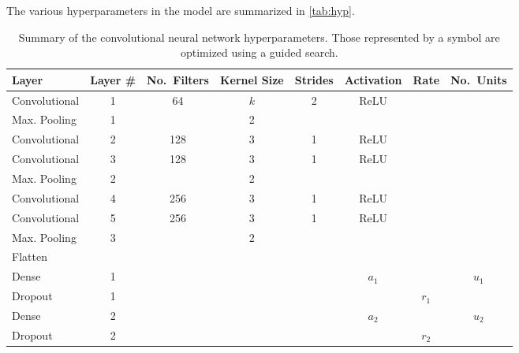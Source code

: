 \documentclass[NewProceedindgs, NoLineNumbers, SectionNumbers, letterpaper, SingleSpace, InsideFigs]{ascelike-new}
\begin{document}
The various hyperparameters in the model are summarized in \autoref{tab:hyp}.
\begin{table}[]\small
{}
    \centering
    \begin{tabular}{l c c c c c c c}\toprule
    \bf Layer & \bf Layer \# & \bf No.\ Filters & \bf Kernel Size & \bf Strides &
    \bf Activation &   \bf Rate & \bf No.\ Units  \\\midrule
    Convolutional  & 1         & 64                & $k$   & 2           & ReLU && \\
    Max. Pooling   & 1         &                   & 2               &&&             &      \\
    Convolutional  & 2         & 128               & 3   & 1           & ReLU && \\
    Convolutional  & 3         & 128               & 3   & 1           & ReLU && \\
    Max. Pooling   & 2         &                   & 2               &&&             &      \\    
    Convolutional  & 4         & 256               & 3   & 1           & ReLU && \\
    Convolutional  & 5         & 256               & 3   & 1           & ReLU && \\
    Max. Pooling   & 3         &                   & 2               &             &&&      \\\midrule
    Flatten & & & & &&& \\\midrule
    Dense           & 1  & & &  &  $a_1$ & & $u_1$ \\
    Dropout         & 1  & & &  && $r_1$ &   \\
    Dense           & 2  & & &  &  $a_2$ & & $u_2$  \\
    Dropout         & 2  & & &  && $r_2$ &  \\ \bottomrule
    \end{tabular}
    \caption{Summary of the convolutional neural network hyperparameters. 
    Those represented by a symbol are optimized using a guided search.}
    \label{tab:hyp}
\end{table}
\end{document}
